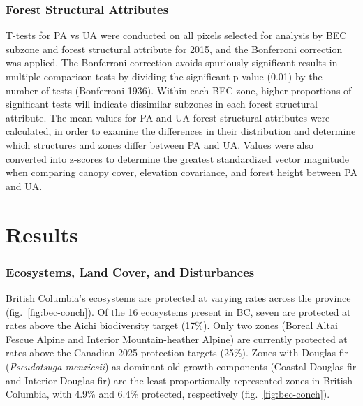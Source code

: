\documentclass[11pt]{article}
\begin{document}
\hypertarget{forest-structural-attributes}{%
\subsubsection{Forest Structural
Attributes}\label{forest-structural-attributes}}

T-tests for PA vs UA were conducted on all pixels selected for analysis
by BEC subzone and forest structural attribute for 2015, and the
Bonferroni correction was applied. The Bonferroni correction avoids
spuriously significant results in multiple comparison tests by dividing
the significant p-value (0.01) by the number of tests (Bonferroni 1936).
Within each BEC zone, higher proportions of significant tests will
indicate dissimilar subzones in each forest structural attribute. The
mean values for PA and UA forest structural attributes were calculated,
in order to examine the differences in their distribution and determine
which structures and zones differ between PA and UA. Values were also
converted into z-scores to determine the greatest standardized vector
magnitude when comparing canopy cover, elevation covariance, and forest
height between PA and UA.

\hypertarget{results}{%
\section{Results}\label{results}}

\hypertarget{ecosystems-land-cover-and-disturbances-1}{%
\subsubsection{Ecosystems, Land Cover, and
Disturbances}\label{ecosystems-land-cover-and-disturbances-1}}

British Columbia's ecosystems are protected at varying rates across the
province (fig.~\ref{fig:bec-conch}). Of the 16 ecosystems present in BC,
seven are protected at rates above the Aichi biodiversity target (17\%).
Only two zones (Boreal Altai Fescue Alpine and Interior Mountain-heather
Alpine) are currently protected at rates above the Canadian 2025
protection targets (25\%). Zones with Douglas-fir (\emph{Pseudotsuga
menziesii}) as dominant old-growth components (Coastal Douglas-fir and
Interior Douglas-fir) are the least proportionally represented zones in
British Columbia, with 4.9\% and 6.4\% protected, respectively
(fig.~\ref{fig:bec-conch}).
\end{document}
